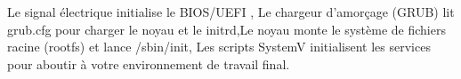 Le signal électrique initialise le BIOS/UEFI , Le chargeur d’amorçage (GRUB)  lit grub.cfg pour charger le noyau et le initrd,Le noyau monte le système de fichiers racine (rootfs) et lance /sbin/init,
Les scripts SystemV initialisent les services pour aboutir à votre environnement de travail final.\\


\clearpage